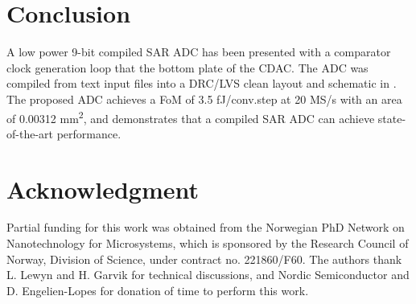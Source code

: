 \section{Conclusion} \label{conclusion}
A low power 9-bit compiled SAR ADC has been presented with a comparator
clock generation loop that  the bottom plate of the CDAC.  The
ADC was compiled from text input files into a DRC/LVS clean layout and
schematic in {\technm}.
The proposed ADC achieves a FoM of 3.5 fJ/conv.step at
20 MS/s with an area of 0.00312 mm\textsuperscript{2}, and demonstrates
that a compiled SAR ADC can achieve state-of-the-art performance.

\section*{Acknowledgment}
Partial funding for this work was obtained from the Norwegian PhD
Network on Nanotechnology for Microsystems, which is sponsored by the
Research Council of Norway, Division of Science, under contract
no. 221860/F60. The authors thank L. Lewyn and H. Garvik for
technical discussions, and Nordic Semiconductor and D. Engelien-Lopes for donation of time to
perform this work.
